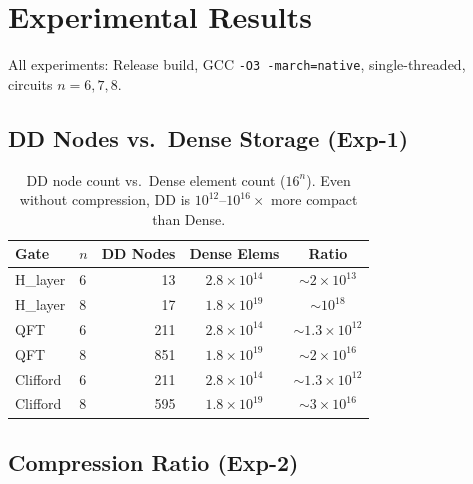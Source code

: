\documentclass[11pt,a4paper]{article}
\begin{document}
\section{Experimental Results}

All experiments: Release build, GCC \texttt{-O3 -march=native},
single-threaded, circuits $n=6,7,8$.

\subsection{DD Nodes vs.\ Dense Storage (Exp-1)}

\begin{table}[h]
\centering
\caption{DD node count vs.\ Dense element count ($16^n$). Even without
  compression, DD is $10^{12}$--$10^{16}\times$ more compact than Dense.}
\label{tab:dense}
\begin{tabular}{llrcc}
\toprule
Gate & $n$ & DD Nodes & Dense Elems & Ratio \\
\midrule
H\_layer  & 6 & 13  & $2.8\times10^{14}$ & $\sim 2\times10^{13}$ \\
H\_layer  & 8 & 17  & $1.8\times10^{19}$ & $\sim 10^{18}$ \\
QFT       & 6 & 211 & $2.8\times10^{14}$ & $\sim 1.3\times10^{12}$ \\
QFT       & 8 & 851 & $1.8\times10^{19}$ & $\sim 2\times10^{16}$ \\
Clifford  & 6 & 211 & $2.8\times10^{14}$ & $\sim 1.3\times10^{12}$ \\
Clifford  & 8 & 595 & $1.8\times10^{19}$ & $\sim 3\times10^{16}$ \\
\bottomrule
\end{tabular}
\end{table}

\subsection{Compression Ratio (Exp-2)}
\end{document}
